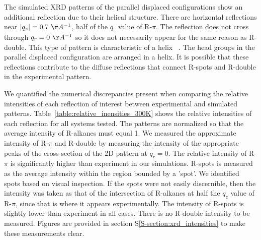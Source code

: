 \documentclass[journal=jpcbfk,manuscript=article]{achemso}
\begin{document}
  The simulated XRD patterns of the parallel displaced configurations show an additional
  reflection due to their helical structure. There are horizontal reflections near $|q_z|= 
  0.7~\AA^{-1}$, half of the $q_z$ value of R-$\pi$. The reflection does not cross through
  $q_r = 0~\AA^{-1}$ so it does not necessarily appear for the same reason as R-double. 
  This type of pattern is characteristic of a helix ~\cite{watson_structure_1953}. The 
  head groups in the parallel displaced configuration are arranged in a helix.
  It is possible that these reflections contribute to the diffuse reflections that connect
  R-spots and R-double in the experimental pattern.

  We quantified the numerical discrepancies present when comparing the relative intensities
  of each reflection of interest between experimental and simulated patterns. 
  Table~\ref{table:relative_inensities_300K} shows the relative intensities of each reflection for 
  all systems tested. The patterns are normalized so that the average intensity of R-alkanes 
  must equal 1. We measured the approximate intensity of R-$\pi$ and R-double by measuring the
  intensity of the appropriate peaks of the cross-section of the 2D pattern at $q_r=0$. The 
  relative intensity of R-$\pi$ is significantly higher than experiment in our simulations. 
  R-spots is measured as the average intensity within the region bounded by a 'spot'. We 
  identified spots based on visual inspection. If the spots were not easily discernible, then the 
  intensity was taken as that of the intersection of R-alkanes at half the $q_z$ value of
  R-$\pi$, since that is where it appears experimentally. The intensity of R-spots is slightly
  lower than experiment in all cases. There is no R-double intensity to be measured. Figures
  are provided in section S\ref{S-section:xrd_intensities} to make these measurements clear.
\end{document}
